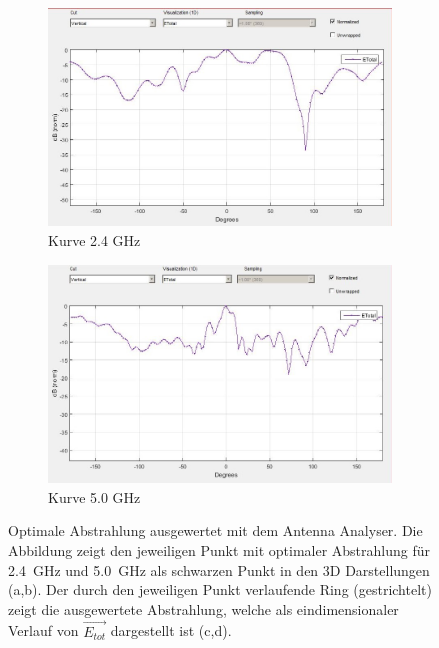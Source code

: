 \begin{figure}[h!]
	\begin{subfigure}[t]{0.49\textwidth}
		\includegraphics[width=1\textwidth]{../fig/plt/2_4GHz_E_tot_curve.jpg}
		\caption{Kurve 2.4 GHz}
	\end{subfigure}
	\begin{subfigure}[t]{0.49\textwidth}
		\includegraphics[width=1\textwidth]{../fig/plt/5GHz_E_tot_curve.jpg}
		\caption{Kurve 5.0 GHz}
	\end{subfigure}
	\caption[Optimale Abstrahlung ausgewertet mit dem Antenna Analyser]{
		Optimale Abstrahlung ausgewertet mit dem Antenna Analyser.
		Die Abbildung zeigt den jeweiligen Punkt mit optimaler
		Abstrahlung für \SI{2.4}{\giga\hertz} und \SI{5.0}{\giga\hertz}
		als schwarzen Punkt in den 3D Darstellungen (a,b). Der durch den
		jeweiligen Punkt verlaufende Ring (gestrichtelt) zeigt die
		ausgewertete Abstrahlung, welche als eindimensionaler Verlauf
		von $\vec{E_{tot}}$ dargestellt ist (c,d).}
	\label{fig:etot_max_measured}
\end{figure}

